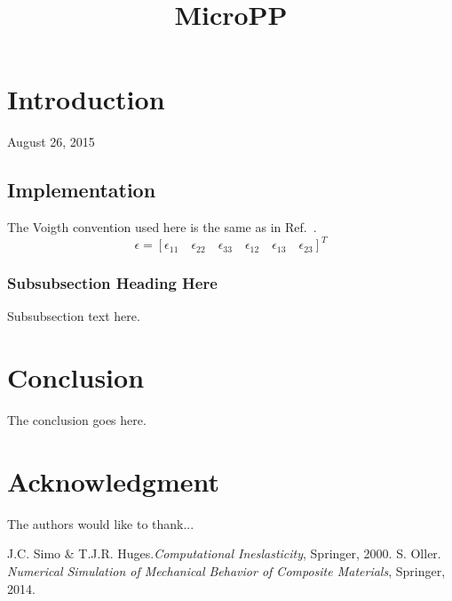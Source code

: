 \documentclass[conference]{IEEEtran}
\begin{document}
\title{MicroPP}

\author{
}

\maketitle


\IEEEpeerreviewmaketitle

\section{Introduction}

\hfill August 26, 2015

\subsection{Implementation}

The Voigth convention used here is the same as in Ref.~\cite{simo}.
\begin{equation}
\epsilon = \left[\epsilon_{11} \quad \epsilon_{22} \quad \epsilon_{33} \quad \epsilon_{12} \quad \epsilon_{13} \quad \epsilon_{23} \right]^T
\end{equation}

\subsubsection{Subsubsection Heading Here}
Subsubsection text here.

\section{Conclusion}
The conclusion goes here.

\section*{Acknowledgment}

The authors would like to thank...

\begin{thebibliography}{1}
 J.C. Simo \& T.J.R. Huges.\emph{Computational Ineslasticity}, Springer, 2000. 
 S. Oller. \emph{Numerical Simulation of Mechanical Behavior of Composite Materials}, Springer, 2014. 
\end{thebibliography}
\end{document}
